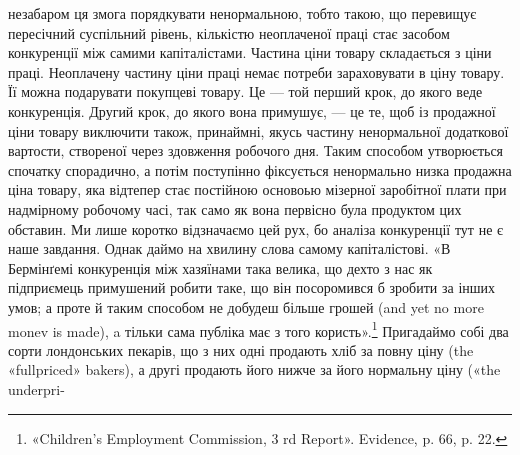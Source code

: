 незабаром ця змога порядкувати ненормальною, тобто такою,
що перевищує пересічний суспільний рівень, кількістю неоплаченої
праці стає засобом конкуренції між самими капіталістами.
Частина ціни товару складається з ціни праці. Неоплачену частину
ціни праці немає потреби зараховувати в ціну товару.
Її можна подарувати покупцеві товару. Це — той перший крок,
до якого веде конкуренція. Другий крок, до якого вона примушує,
— це те, щоб із продажної ціни товару виключити також,
принаймні, якусь частину ненормальної додаткової вартости, створеної
через здовження робочого дня. Таким способом утворюється
спочатку спорадично, а потім поступінно фіксується ненормально
низка продажна ціна товару, яка відтепер стає постійною
основоью мізерної заробітної плати при надмірному
робочому часі, так само як вона первісно була продуктом цих
обставин. Ми лише коротко відзначаємо цей рух, бо аналіза конкуренції
тут не є наше завдання. Однак даймо на хвилину слова
самому капіталістові. «В Бермінґемі конкуренція між хазяїнами
така велика, що дехто з нас як підприємець примушений робити
таке, що він посоромився б зробити за інших умов; а проте й
таким способом не добудеш більше грошей (and yet no more
monev is made), a тільки сама публіка має з того користь».\footnote{
«Children’s Employment Commission, 3 rd Report». Evidence, p. 66, p. 22.
}
Пригадаймо собі два сорти лондонських пекарів, що з них одні
продають хліб за повну ціну (the «fullpriced» bakers), а другі
продають його нижче за його нормальну ціну («the underpri-


